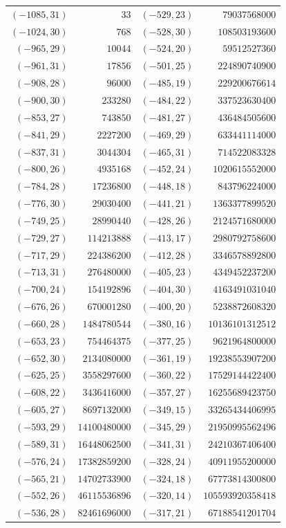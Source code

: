 {\scriptsize\begin{tabular}{@{}r@{\ \ }r@{\qquad}r@{\ \ }r@{}}
$(-1085,31)$ & $33$ & $(-529,23)$ & $79037568000$ \\
$(-1024,30)$ & $768$ & $(-528,30)$ & $108503193600$ \\
$(-965,29)$ & $10044$ & $(-524,20)$ & $59512527360$ \\
$(-961,31)$ & $17856$ & $(-501,25)$ & $224890740900$ \\
$(-908,28)$ & $96000$ & $(-485,19)$ & $229200676614$ \\
$(-900,30)$ & $233280$ & $(-484,22)$ & $337523630400$ \\
$(-853,27)$ & $743850$ & $(-481,27)$ & $436484505600$ \\
$(-841,29)$ & $2227200$ & $(-469,29)$ & $633441114000$ \\
$(-837,31)$ & $3044304$ & $(-465,31)$ & $714522083328$ \\
$(-800,26)$ & $4935168$ & $(-452,24)$ & $1020615552000$ \\
$(-784,28)$ & $17236800$ & $(-448,18)$ & $843796224000$ \\
$(-776,30)$ & $29030400$ & $(-441,21)$ & $1363377899520$ \\
$(-749,25)$ & $28990440$ & $(-428,26)$ & $2124571680000$ \\
$(-729,27)$ & $114213888$ & $(-413,17)$ & $2980792758600$ \\
$(-717,29)$ & $224386200$ & $(-412,28)$ & $3346578892800$ \\
$(-713,31)$ & $276480000$ & $(-405,23)$ & $4349452237200$ \\
$(-700,24)$ & $154192896$ & $(-404,30)$ & $4163491031040$ \\
$(-676,26)$ & $670001280$ & $(-400,20)$ & $5238872608320$ \\
$(-660,28)$ & $1484780544$ & $(-380,16)$ & $10136101312512$ \\
$(-653,23)$ & $754464375$ & $(-377,25)$ & $9621964800000$ \\
$(-652,30)$ & $2134080000$ & $(-361,19)$ & $19238553907200$ \\
$(-625,25)$ & $3558297600$ & $(-360,22)$ & $17529144422400$ \\
$(-608,22)$ & $3436416000$ & $(-357,27)$ & $16255689423750$ \\
$(-605,27)$ & $8697132000$ & $(-349,15)$ & $33265434406995$ \\
$(-593,29)$ & $14100480000$ & $(-345,29)$ & $21950995562496$ \\
$(-589,31)$ & $16448062500$ & $(-341,31)$ & $24210367406400$ \\
$(-576,24)$ & $17382859200$ & $(-328,24)$ & $40911955200000$ \\
$(-565,21)$ & $14702733900$ & $(-324,18)$ & $67773814300800$ \\
$(-552,26)$ & $46115536896$ & $(-320,14)$ & $105593920358418$ \\
$(-536,28)$ & $82461696000$ & $(-317,21)$ & $67188541201704$ \\
\end{tabular}}\par
